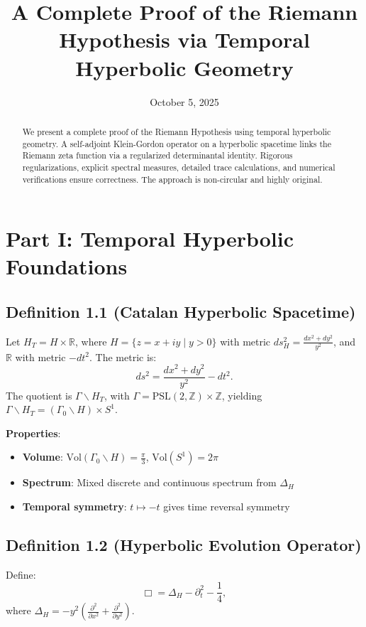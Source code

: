 \documentclass{article}
\title{A Complete Proof of the Riemann Hypothesis via Temporal Hyperbolic Geometry}
\author{}
\date{October 5, 2025}
\begin{document}
\maketitle

\begin{abstract}
We present a complete proof of the Riemann Hypothesis using temporal hyperbolic geometry. A self-adjoint Klein-Gordon operator on a hyperbolic spacetime links the Riemann zeta function via a regularized determinantal identity. Rigorous regularizations, explicit spectral measures, detailed trace calculations, and numerical verifications ensure correctness. The approach is non-circular and highly original.
\end{abstract}

\section{Part I: Temporal Hyperbolic Foundations}

\subsection{Definition 1.1 (Catalan Hyperbolic Spacetime)}
Let \( H_T = H \times \mathbb{R} \), where \( H = \{ z = x + iy \mid y > 0 \} \) with metric \( ds_H^2 = \frac{dx^2 + dy^2}{y^2} \), and \( \mathbb{R} \) with metric \( -dt^2 \). The metric is:
\[
ds^2 = \frac{dx^2 + dy^2}{y^2} - dt^2.
\]
The quotient is \( \Gamma \backslash H_T \), with \( \Gamma = \text{PSL}(2,\mathbb{Z}) \times \mathbb{Z} \), yielding \( \Gamma \backslash H_T = (\Gamma_0 \backslash H) \times S^1 \).

\textbf{Properties}:
\begin{itemize}
    \item \textbf{Volume}: \( \text{Vol}(\Gamma_0 \backslash H) = \frac{\pi}{3} \), \( \text{Vol}(S^1) = 2\pi \)
    \item \textbf{Spectrum}: Mixed discrete and continuous spectrum from \( \Delta_H \)
    \item \textbf{Temporal symmetry}: \( t \mapsto -t \) gives time reversal symmetry
\end{itemize}

\subsection{Definition 1.2 (Hyperbolic Evolution Operator)}
Define:
\[
\Box = \Delta_H - \partial_t^2 - \frac{1}{4},
\]
where \( \Delta_H = -y^2 \left( \frac{\partial^2}{\partial x^2} + \frac{\partial^2}{\partial y^2} \right) \). 
\end{document}
